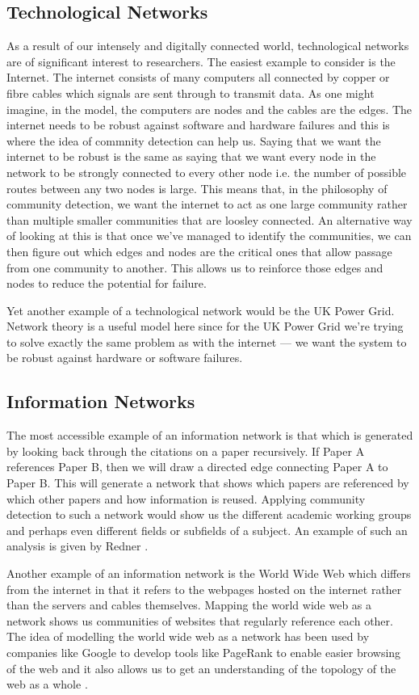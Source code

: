 \subsection{Technological Networks}\label{sec:Technological Networks}
As a result of our intensely and digitally connected world, technological networks are of significant interest to researchers. The easiest example to consider is the Internet. The internet consists of many computers all connected by copper or fibre cables which signals are sent through to transmit data. As one might imagine, in the model, the computers are nodes and the cables are the edges. The internet needs to be robust against software and hardware failures and this is where the idea of commnity detection can help us. Saying that we want the internet to be robust is the same as saying that we want every node in the network to be strongly connected to every other node i.e. the number of possible routes between any two nodes is large. This means that, in the philosophy of community detection, we want the internet to act as one large community rather than multiple smaller communities that are loosley connected. An alternative way of looking at this is that once we've managed to identify the communities, we can then figure out which edges and nodes are the critical ones that allow passage from one community to another. This allows us to reinforce those edges and nodes to reduce the potential for failure.

Yet another example of a technological network would be the UK Power Grid. Network theory is a useful model here since for the UK Power Grid we're trying to solve exactly the same problem as with the internet --- we want the system to be robust against hardware or software failures.

\subsection{Information Networks}\label{sec:Information Networks}
The most accessible example of an information network is that which is generated by looking back through the citations on a paper recursively. If Paper A references Paper B, then we will draw a directed edge connecting Paper A to Paper B. This will generate a network that shows which papers are referenced by which other papers and how information is reused. Applying community detection to such a network would show us the different academic working groups and perhaps even different fields or subfields of a subject. An example of such an analysis is given by Redner \cite{Redner1998}.

Another example of an information network is the World Wide Web which differs from the internet in that it refers to the webpages hosted on the internet rather than the servers and cables themselves. Mapping the world wide web as a network shows us communities of websites that regularly reference each other. The idea of modelling the world wide web as a network has been used by companies like Google to develop tools like PageRank to enable easier browsing of the web \cite{pagerank} and it also allows us to get an understanding of the topology of the web as a whole \cite{BARABASI200069}.
